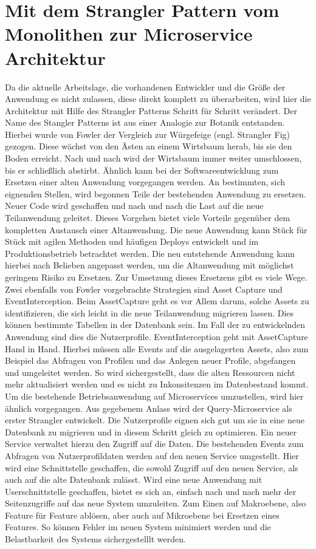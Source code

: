 \section{Mit dem Strangler Pattern vom Monolithen zur Microservice Architektur}
Da die aktuelle Arbeitslage, die vorhandenen Entwickler und die Größe der Anwendung es nicht zulassen, diese direkt komplett zu überarbeiten, wird hier die Architektur mit Hilfe des Strangler Patterns Schritt für Schritt verändert.
Der Name des Stangler Patterns ist aus einer Analogie zur Botanik entstanden. Hierbei wurde von Fowler\cite[][]{Fowler:Strangler} der Vergleich zur Würgefeige (engl. Strangler Fig) gezogen. Diese wächst von den Ästen an einem Wirtsbaum herab, bis sie den Boden erreicht. Nach und nach wird der Wirtsbaum immer weiter umschlossen, bis er schließlich abstirbt.
Ähnlich kann bei der Softwareentwicklung zum Ersetzen einer alten Anwendung vorgegangen werden. An bestimmten, sich eignenden Stellen, wird begonnen Teile der bestehenden Anwendung zu ersetzen. Neuer Code wird geschaffen und nach und nach die Last auf die neue Teilanwendung geleitet.
Dieses Vorgehen bietet viele Vorteile gegenüber dem kompletten Austausch einer Altanwendung. Die neue Anwendung kann Stück für Stück mit agilen Methoden und häufigen Deploys entwickelt und im Produktionsbetrieb betrachtet werden. Die neu entstehende Anwendung kann hierbei nach Belieben angepasst werden, um die Altanwendung mit möglichst geringem Risiko zu Ersetzen.
Zur Umsetzung dieses Ersetzens gibt es viele Wege. Zwei ebenfalls von Fowler vorgebrachte Strategien sind Asset Capture\cite[][]{Fowler:Capture} und EventInterception\cite[][]{Fowler:Interception}.
Beim AssetCapture geht es vor Allem darum, solche Assets zu identifizieren, die sich leicht in die neue Teilanwendung migrieren lassen. Dies können bestimmte Tabellen in der Datenbank sein. Im Fall der zu entwickelnden Anwendung sind dies die Nutzerprofile.
EventInterception geht mit AssetCapture Hand in Hand. Hierbei müssen alle Events auf die ausgelagerten Assets, also zum Beispiel das Abfragen von Profilen und das Anlegen neuer Profile, abgefangen und umgeleitet werden.
So wird sichergestellt, dass die alten Ressourcen nicht mehr aktualisiert werden und es nicht zu Inkonsitenzen im Datenbestand kommt.
Um die bestehende Betriebsanwendung auf Microservices umzustellen, wird hier ähnlich vorgegangen. Aus gegebenem Anlass wird der Query-Microservice als erster Strangler entwickelt. Die Nutzerprofile eignen sich gut um sie in eine neue Datenbank zu migrieren und in diesem Schritt gleich zu optimieren. Ein neuer Service verwaltet hierzu den Zugriff auf die Daten. Die bestehenden Events zum Abfragen von Nutzerprofildaten werden auf den neuen Service umgestellt. Hier wird eine Schnittstelle geschaffen, die sowohl Zugriff auf den neuen Service, als auch auf die alte Datenbank zulässt. Wird eine neue Anwendung mit Userschnittstelle geschaffen, bietet es sich an, einfach nach und nach mehr der Seitenzugriffe auf das neue System umzuleiten. Zum Einen auf Makroebene, also Feature für Feature ablösen, aber auch auf Mikroebene bei Ersetzen eines Features. So können Fehler im neuen System minimiert werden und die Belastbarkeit des Systems sichergestelllt werden.
